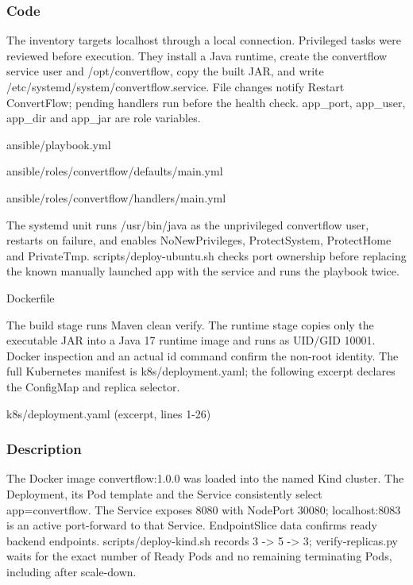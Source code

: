 \documentclass[12pt,a4paper]{article}
\begin{document}
\subsubsection*{Code}
The inventory targets localhost through a local connection. Privileged tasks were reviewed before execution. They install a Java runtime, create the convertflow service user and /opt/convertflow, copy the built JAR, and write /etc/systemd/system/convertflow.service. File changes notify Restart ConvertFlow; pending handlers run before the health check. app\_port, app\_user, app\_dir and app\_jar are role variables.

ansible/playbook.yml


ansible/roles/convertflow/defaults/main.yml


ansible/roles/convertflow/handlers/main.yml


The systemd unit runs /usr/bin/java as the unprivileged convertflow user, restarts on failure, and enables NoNewPrivileges, ProtectSystem, ProtectHome and PrivateTmp. scripts/deploy-ubuntu.sh checks port ownership before replacing the known manually launched app with the service and runs the playbook twice.

Dockerfile


The build stage runs Maven clean verify. The runtime stage copies only the executable JAR into a Java 17 runtime image and runs as UID/GID 10001. Docker inspection and an actual id command confirm the non-root identity. The full Kubernetes manifest is k8s/deployment.yaml; the following excerpt declares the ConfigMap and replica selector.

k8s/deployment.yaml (excerpt, lines 1-26)


\subsubsection*{Description}
The Docker image convertflow:1.0.0 was loaded into the named Kind cluster. The Deployment, its Pod template and the Service consistently select app=convertflow. The Service exposes 8080 with NodePort 30080; localhost:8083 is an active port-forward to that Service. EndpointSlice data confirms ready backend endpoints. scripts/deploy-kind.sh records 3 -> 5 -> 3; verify-replicas.py waits for the exact number of Ready Pods and no remaining terminating Pods, including after scale-down.
\end{document}
